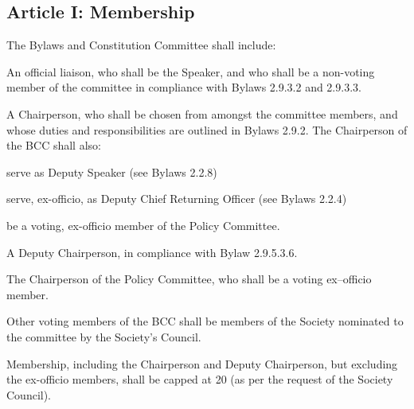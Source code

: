 \subsection{Article I: Membership}
\begin{longenum}[ label*=\thesubsection.\arabic*., align=left] 
\item The Bylaws and Constitution Committee shall include:
	\begin{longenum}[ label*=\arabic*., align=left] 
	\item An official liaison, who shall be the Speaker, and who shall be a non-voting member of the committee in compliance with Bylaws 2.9.3.2 and 2.9.3.3.
	\item A Chairperson, who shall be chosen from amongst the committee members, and whose duties and responsibilities are outlined in Bylaws 2.9.2. The Chairperson of the BCC shall also:
		\begin{longenum}[ label*=\arabic*., align=left] 
		\item serve as Deputy Speaker (see Bylaws 2.2.8)
		\item serve, ex-officio, as Deputy Chief Returning Officer (see Bylaws 2.2.4)
		\item be a voting, ex-officio member of the Policy Committee.
		\end{longenum}
	\item A Deputy Chairperson, in compliance with Bylaw 2.9.5.3.6.
	\item The Chairperson of the Policy Committee, who shall be a voting ex–officio member.
	\end{longenum}
\item Other voting members of the BCC shall be members of the Society nominated to the committee by the Society's Council.
\item Membership, including the Chairperson and Deputy Chairperson, but excluding the ex-officio members, shall be capped at 20 (as per the request of the Society Council).
\end{longenum}

